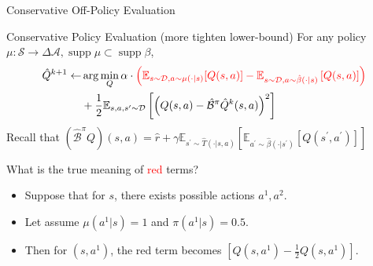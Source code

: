 \documentclass[11pt]{beamer}
\newcommand{\mbb}[1]{\mathbb{#1}}
\newcommand{\mc}[1]{\mathcal{#1}}
\newcommand{\supp}{\operatorname{supp}}
\begin{document}
\begin{frame}{Conservative Off-Policy Evaluation}
    \begin{block}{Conservative Policy Evaluation (more tighten lower-bound)}
    For any policy $\mu : \mc{S} \to \Delta{\mc{A}}, \supp \mu \subset \supp \beta$,
    \[
    \begin{aligned}
          \hat{Q}^{k+1} \leftarrow &\arg \min_{Q} \alpha \cdot \textcolor{red}{\left(\mbb{E}_{s \sim \mc{D}, a \sim \mu(\cdot|s)}[Q(s,a)] - \mbb{E}_{s \sim \mc{D}, a \sim \hat{\beta}(\cdot|s)} \left[Q(s,a)\right] \right)} \\
          &+ \frac{1}{2} \mbb{E}_{s,a,s^\prime \sim \mc{D}} \left[ \left(Q(s,a) - \hat{\mc{B}}^\pi \hat{Q}^{k}(s,a)\right)^2\right]
  \end{aligned}
  \]
  Recall that $ (\hat{\mc{B}}^\pi Q)(s,a) = \hat{r} + \gamma \mbb{E}_{s^\prime \sim \hat{T}(\cdot | s,a)}\left[\mbb{E}_{a^\prime \sim \hat{\beta}(\cdot |s^\prime)} \left[ Q(s^\prime,a^\prime) \right]\right]$
  \end{block}

  What is the true meaning of \textcolor{red}{red} terms?
  \begin{itemize}
    \item Suppose that for $s$, there exists possible actions $a^1, a^2$.
    \item Let assume $\mu(a^1|s) = 1$ and $\pi(a^1|s) = 0.5$.
    \item Then for $(s,a^1)$, the red term becomes $\left[ Q(s,a^1) - \frac{1}{2}Q(s,a^1) \right]$.
  \end{itemize}


\end{frame}
\end{document}
